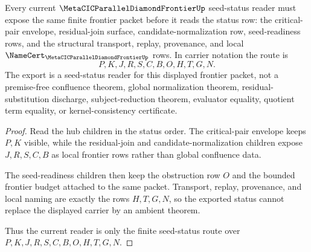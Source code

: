 \begin{theorem}
\label{thm:metacic-parallel-diamond-frontier-current-seed-status-export}
Every current $\MetaCICParallelDiamondFrontierUp$ seed-status reader must expose the same finite frontier packet before it reads the status row: the critical-pair envelope, residual-join surface, candidate-normalization row, seed-readiness rows, and the structural transport, replay, provenance, and local $\NameCert_{\MetaCICParallelDiamondFrontierUp}$ rows. In carrier notation the route is
$$
P,K,J,R,S,C,B,O,H,T,G,N .
$$
The export is a seed-status reader for this displayed frontier packet, not a premise-free confluence theorem, global normalization theorem, residual-substitution discharge, subject-reduction theorem, evaluator equality, quotient term equality, or kernel-consistency certificate.
\end{theorem}
\begin{proof}
Read the hub children in the status order. The critical-pair envelope keeps $P,K$ visible, while the residual-join and candidate-normalization children expose $J,R,S,C,B$ as local frontier rows rather than global confluence data.

The seed-readiness children then keep the obstruction row $O$ and the bounded frontier budget attached to the same packet. Transport, replay, provenance, and local naming are exactly the rows $H,T,G,N$, so the exported status cannot replace the displayed carrier by an ambient theorem.

Thus the current reader is only the finite seed-status route over $P,K,J,R,S,C,B,O,H,T,G,N$.
\end{proof}
